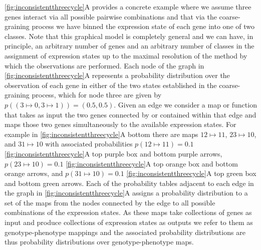 \ref{fig:inconsistentthreecycle}A provides a concrete example where we assume three genes interact via all possible pairwise combinations and that via the coarse-graining process we have binned the expression state of each gene into one of two classes. Note that this graphical model is completely general and we can have, in principle, an arbitrary number of genes and an arbitrary number of classes in the assignment of expression states up to the maximal resolution of the method by which the observations are performed. Each node of the graph in \ref{fig:inconsistentthreecycle}A represents a probability distribution over the observation of each gene in either of the two states established in the coarse-graining process, which for node three are given by $p((3 \mapsto 0, 3 \mapsto 1))=(0.5,0.5)$. Given an edge we consider a map or function that takes as input the two genes connected by or contained within that edge and maps those two genes simultaneously to the available expression states. For example in \ref{fig:inconsistentthreecycle}A bottom there are maps $12 \mapsto 11$, $23 \mapsto 10$, and $31 \mapsto 10$ with associated probabilities $p(12 \mapsto 11)=0.1$ \ref{fig:inconsistentthreecycle}A top purple box and bottom purple arrows, $p(23 \mapsto 10)=0.1$ \ref{fig:inconsistentthreecycle}A top orange box and bottom orange arrows, and $p(31 \mapsto 10)=0.1$ \ref{fig:inconsistentthreecycle}A top green box and bottom green arrows. Each of the probability tables adjacent to each edge in the graph in \ref{fig:inconsistentthreecycle}A assigns a probability distribution to a set of the maps from the nodes connected by the edge to all possible combinations of the expression states. As these maps take collections of genes as input and produce collections of expression states as outputs we refer to them as genotype-phenotype mappings and the associated probability distributions are thus probability distributions over genotype-phenotype maps.

